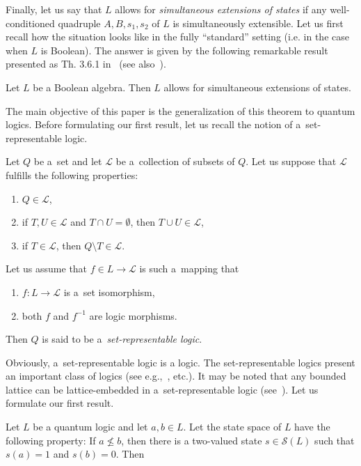\documentclass{article}
\begin{document}
{Finally, let us say that $L$ allows for \textit{simultaneous extensions of states} if any well-conditioned quadruple $A,B,s_1,s_2$ of $L$ is simultaneously extensible. Let us first recall how the situation looks like in the fully ``standard'' setting
(i.e. in the case when $L$ is Boolean). The answer is given by the
following remarkable result presented
as Th. 3.6.1 in~\cite{RaoRao} (see also~\cite{HornTarski}).

\begin{theorem}
Let $L$ be a Boolean algebra. Then $L$ allows for simultaneous extensions of states.
\end{theorem}

The main objective of this paper is the generalization of this theorem to quantum logics. Before formulating our first result, let us recall the notion of a~set-representable logic.
\begin{definition}
    Let $Q$ be a~set and let $\mathcal{L}$ be a~collection of subsets of $Q$. Let us suppose that $\mathcal{L}$ fulfills the following properties:
    \begin{enumerate}
        \item $Q \in \mathcal{L}$,
        \item if $T, U \in \mathcal{L}$ and $T \cap U = \emptyset$, then $T \cup U \in \mathcal{L}$,
        \item if $T \in \mathcal{L}$, then $Q \setminus T \in \mathcal{L}$.
    \end{enumerate}
    Let us assume that $f \in L \to \mathcal{L}$ is such a~mapping that 
    \begin{enumerate}
        \item $f: L \to \mathcal{L}$ is a~set isomorphism,
        \item both $f$ and $f^{-1}$ are logic morphisms.
    \end{enumerate}
    Then $Q$ is said to be a~\textit{set-representable logic}. 
\end{definition}
Obviously, a~set-representable logic is a logic. The set-representable logics present an important class of logics (see e.g.,~\cite{BuresovaPtak, GudderPaper, PtakConcrete, Svozil}, etc.). It may be noted that any bounded lattice can be lattice-embedded in a~set-representable logic (see~\cite{Kalmbach, HardingNavara}).
Let us formulate our first result.

\begin{theorem}\label{Th1}
Let $L$ be a quantum logic and let $a,b \in L$. Let the state space of $L$ have the following property: If $a\not\leq b$, then there is a two-valued state $s\in \mathcal{S}(L)$ such that $s(a)=1$ and $s(b)=0$. Then


\end{theorem}}
\end{document}
